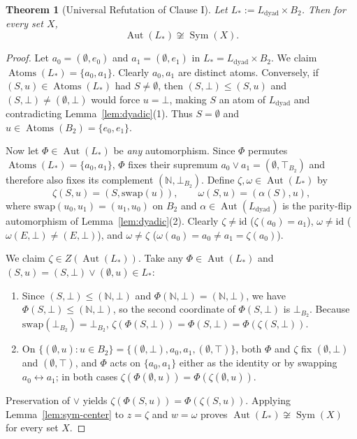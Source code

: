 \documentclass[11pt]{article}
\newtheorem{theorem}{Theorem}[section]
\theoremstyle{definition}
\theoremstyle{remark}
\newcommand{\Aut}{\operatorname{Aut}}
\newcommand{\Sym}{\operatorname{Sym}}
\newcommand{\Atoms}{\operatorname{Atoms}}
\newcommand{\id}{\mathrm{id}}
\newcommand{\N}{\mathbb{N}}
\newcommand{\Ldyad}{L_{\mathrm{dyad}}}
\begin{document}
\begin{theorem}[Universal Refutation of Clause I]
\label{thm:clause1-false}
Let $L_* := \Ldyad \times B_2$. Then for \emph{every} set $X$,
\[
  \Aut(L_*) \not\cong \Sym(X).
\]
\end{theorem}
\begin{proof}
Let $a_0 = (\emptyset, e_0)$ and $a_1 = (\emptyset, e_1)$ in $L_* = \Ldyad \times B_2$. We claim $\Atoms(L_*) = \{a_0, a_1\}$. Clearly $a_0, a_1$ are distinct atoms. Conversely, if $(S, u) \in \Atoms(L_*)$ had $S \neq \emptyset$, then $(S, \bot) \le (S, u)$ and $(S, \bot) \neq (\emptyset, \bot)$ would force $u = \bot$, making $S$ an atom of $\Ldyad$ and contradicting Lemma~\ref{lem:dyadic}(1). Thus $S = \emptyset$ and $u \in \Atoms(B_2) = \{e_0, e_1\}$.

Now let $\Phi \in \Aut(L_*)$ be \emph{any} automorphism. Since $\Phi$ permutes $\Atoms(L_*) = \{a_0, a_1\}$, $\Phi$ fixes their supremum $a_0 \vee a_1 = (\emptyset, \top_{B_2})$ and therefore also fixes its complement $(\N, \bot_{B_2})$. Define $\zeta, \omega \in \Aut(L_*)$ by
\[
  \zeta(S, u) = (S, \mathrm{swap}(u)), \qquad \omega(S, u) = (\alpha(S), u),
\]
where $\mathrm{swap}(u_0, u_1) = (u_1, u_0)$ on $B_2$ and $\alpha \in \Aut(\Ldyad)$ is the parity-flip automorphism of Lemma~\ref{lem:dyadic}(2). Clearly $\zeta \neq \id$ ($\zeta(a_0) = a_1$), $\omega \neq \id$ ($\omega(E, \bot) \neq (E, \bot)$), and $\omega \neq \zeta$ ($\omega(a_0) = a_0 \neq a_1 = \zeta(a_0)$).

We claim $\zeta \in Z(\Aut(L_*))$. Take any $\Phi \in \Aut(L_*)$ and $(S, u) = (S, \bot) \vee (\emptyset, u) \in L_*$:
\begin{enumerate}
  \item Since $(S, \bot) \le (\N, \bot)$ and $\Phi(\N, \bot) = (\N, \bot)$, we have $\Phi(S, \bot) \le (\N, \bot)$, so the second coordinate of $\Phi(S, \bot)$ is $\bot_{B_2}$. Because $\mathrm{swap}(\bot_{B_2}) = \bot_{B_2}$, $\zeta(\Phi(S, \bot)) = \Phi(S, \bot) = \Phi(\zeta(S, \bot))$.
  \item On $\{(\emptyset, u) : u \in B_2\} = \{(\emptyset, \bot), a_0, a_1, (\emptyset, \top)\}$, both $\Phi$ and $\zeta$ fix $(\emptyset, \bot)$ and $(\emptyset, \top)$, and $\Phi$ acts on $\{a_0, a_1\}$ either as the identity or by swapping $a_0 \leftrightarrow a_1$; in both cases $\zeta(\Phi(\emptyset, u)) = \Phi(\zeta(\emptyset, u))$.
\end{enumerate}
Preservation of $\vee$ yields $\zeta(\Phi(S, u)) = \Phi(\zeta(S, u))$. Applying Lemma~\ref{lem:sym-center} to $z = \zeta$ and $w = \omega$ proves $\Aut(L_*) \not\cong \Sym(X)$ for every set $X$.
\end{proof}
\end{document}

